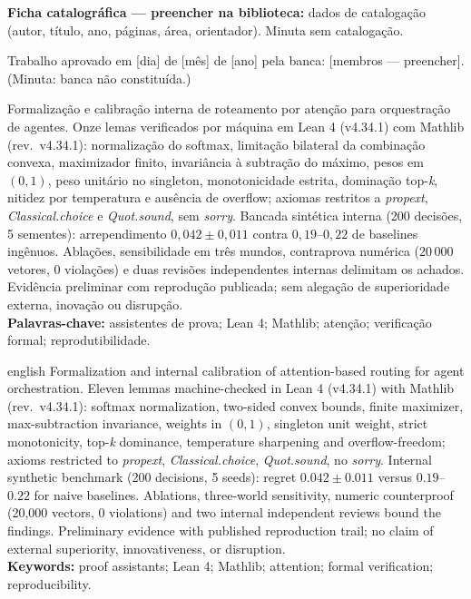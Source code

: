 \documentclass[12pt,openany,oneside,a4paper,brazil]{abntex2}
\begin{document}
\frenchspacing
\imprimircapa
\imprimirfolhaderosto
\clearpage\thispagestyle{empty}\vspace*{\fill}
\begin{center}
\textbf{Ficha catalográfica --- preencher na biblioteca:} dados de catalogação (autor, título, ano, páginas, área, orientador). Minuta sem catalogação.
\end{center}
\vspace*{\fill}\clearpage
\begin{folhadeaprovacao}
Trabalho aprovado em [dia] de [mês] de [ano] pela banca: [membros --- preencher]. (Minuta: banca não constituída.)
\end{folhadeaprovacao}
\begin{resumo}
Formalização e calibração interna de roteamento por atenção para orquestração de agentes. Onze lemas verificados por máquina em Lean 4 (v4.34.1) com Mathlib (rev.\ v4.34.1): normalização do softmax, limitação bilateral da combinação convexa, maximizador finito, invariância à subtração do máximo, pesos em $(0,1)$, peso unitário no singleton, monotonicidade estrita, dominação top-\textit{k}, nitidez por temperatura e ausência de overflow; axiomas restritos a \textit{propext}, \textit{Classical.choice} e \textit{Quot.sound}, sem \textit{sorry}. Bancada sintética interna (200 decisões, 5 sementes): arrependimento $0{,}042\pm0{,}011$ contra $0{,}19$--$0{,}22$ de baselines ingênuos. Ablações, sensibilidade em três mundos, contraprova numérica (20\,000 vetores, 0 violações) e duas revisões independentes internas delimitam os achados. Evidência preliminar com reprodução publicada; sem alegação de superioridade externa, inovação ou disrupção.\\
\textbf{Palavras-chave:} assistentes de prova; Lean 4; Mathlib; atenção; verificação formal; reprodutibilidade.
\end{resumo}
\begin{resumo}[Abstract]
\begin{otherlanguage*}{english}
Formalization and internal calibration of attention-based routing for agent orchestration. Eleven lemmas machine-checked in Lean 4 (v4.34.1) with Mathlib (rev.\ v4.34.1): softmax normalization, two-sided convex bounds, finite maximizer, max-subtraction invariance, weights in $(0,1)$, singleton unit weight, strict monotonicity, top-\textit{k} dominance, temperature sharpening and overflow-freedom; axioms restricted to \textit{propext}, \textit{Classical.choice}, \textit{Quot.sound}, no \textit{sorry}. Internal synthetic benchmark (200 decisions, 5 seeds): regret $0.042\pm0.011$ versus $0.19$--$0.22$ for naive baselines. Ablations, three-world sensitivity, numeric counterproof (20,000 vectors, 0 violations) and two internal independent reviews bound the findings. Preliminary evidence with published reproduction trail; no claim of external superiority, innovativeness, or disruption.\\
\textbf{Keywords:} proof assistants; Lean 4; Mathlib; attention; formal verification; reproducibility.
\end{otherlanguage*}
\end{resumo}
\end{document}
